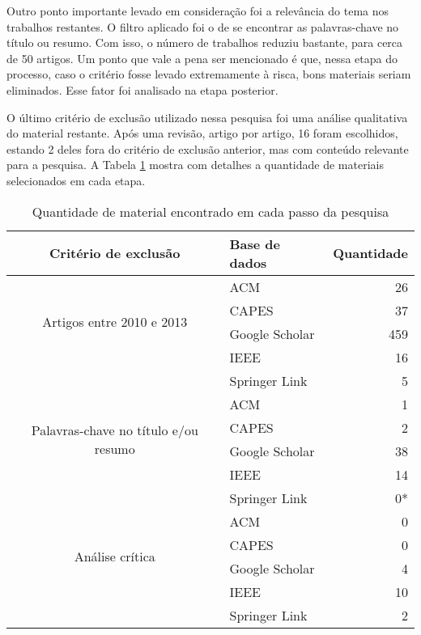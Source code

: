 Outro ponto importante levado em consideração foi a relevância do tema nos trabalhos restantes. O filtro aplicado foi o de se encontrar as palavras-chave no título ou resumo. Com isso, o número de trabalhos reduziu bastante, para cerca de 50 artigos. Um ponto que vale a pena ser mencionado é que, nessa etapa do processo, caso o critério fosse levado extremamente à risca, bons materiais seriam eliminados. Esse fator foi analisado na etapa posterior.

O último critério de exclusão utilizado nessa pesquisa foi uma análise qualitativa do material restante. Após uma revisão, artigo por artigo, 16 foram escolhidos, estando 2 deles fora do critério de exclusão anterior, mas com conteúdo relevante para a pesquisa. A Tabela  \ref{tab:quantidadeDeMateriais} mostra com detalhes a quantidade de materiais selecionados em cada etapa.

\begin{table}[H]
	\centering
	\begin{tabular}{| c | l | r |} \hline \textbf{Critério de exclusão} & \textbf{Base de dados}  & \textbf{Quantidade} \\ \hline
		\multirow{4}{*}{Artigos entre 2010 e 2013} 
			& ACM & 26 \\ \cline{2-3}
			& CAPES & 37 \\ \cline{2-3}
			& Google Scholar & 459 \\ \cline{2-3}
			& IEEE & 16 \\ \cline{2-3}
			& Springer Link & 5 \\ \cline{2-3}
		\hline \hline
		\multirow{4}{*}{Palavras-chave no título e/ou resumo} 
			& ACM & 1 \\ \cline{2-3}
			& CAPES & 2 \\ \cline{2-3}
			& Google Scholar & 38 \\ \cline{2-3}
			& IEEE & 14 \\ \cline{2-3}
			& Springer Link & 0* \\ \cline{2-3}
		\hline \hline
		\multirow{4}{*}{Análise crítica}
			& ACM & 0 \\ \cline{2-3}
			& CAPES & 0 \\ \cline{2-3}
			& Google Scholar & 4 \\ \cline{2-3}
			& IEEE & 10 \\ \cline{2-3}
			& Springer Link & 2 \\ \cline{2-3}
		\hline
	\end{tabular}
	\captionsetup{justification=centering}
	\caption{Quantidade de material encontrado em cada passo da pesquisa}
	\label{tab:quantidadeDeMateriais}
\end{table}


